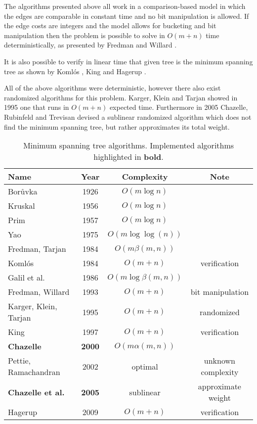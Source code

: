 The algorithms presented above all work in a comparison-based model in which the edges are comparable in constant time and no bit manipulation is allowed. If the edge costs are integers and the model allows for bucketing and bit manipulation then the problem is possible to solve in $O(m + n)$ time deterministically, as presented by Fredman and Willard \cite{fredmanWillard}.

It is also possible to verify in linear time that given tree is the minimum spanning tree as shown by Komlós \cite{komlos1984}, King \cite{king1997} and Hagerup \cite{hagerup2009even}.

All of the above algorithms were deterministic, however there also exist randomized algorithms for this problem. Karger, Klein and Tarjan showed in 1995 \cite{kkt} one that runs in $O(m + n)$ expected time. Furthermore in 2005 Chazelle, Rubinfeld and Trevisan \cite{crt} devised a sublinear randomized algorithm which does not find the minimum spanning tree, but rather approximates its total weight.

\begin{table}[H]
\centering
\caption{Minimum spanning tree algorithms. Implemented algorithms highlighted in \textbf{bold}.}
\begin{tabular}{l c c c}
\toprule
\textbf{Name} & \textbf{Year} & \textbf{Complexity} & \textbf{Note} \\
\midrule
Borůvka & 1926 & $O(m\log{n})$ & \\
Kruskal & 1956 & $O(m\log{n})$ & \\
Prim & 1957 & $O(m\log{n})$ & \\
Yao & 1975 & $O(m \log\log(n))$ & \\
Fredman, Tarjan & 1984 & $O(m \beta(m, n))$ & \\
Komlós & 1984 & $O(m + n)$ & verification\\
Galil et al. & 1986 & $O(m \log\beta(m, n))$ & \\ 
Fredman, Willard & 1993 & $O(m + n)$ & bit manipulation \\
Karger, Klein, Tarjan & 1995 & $O(m + n)$ & randomized \\
King & 1997 & $O(m + n)$ & verification \\ 
\textbf{Chazelle} & \textbf{2000} & $O(m\alpha(m,n))$ & \\
Pettie, Ramachandran & 2002 & optimal & unknown complexity\\
\textbf{Chazelle et al.} & \textbf{2005} & sublinear & approximate weight \\
Hagerup & 2009 & $O(m + n)$ & verification \\
\bottomrule
\end{tabular}
\end{table}


